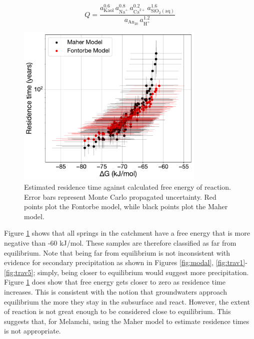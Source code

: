 \begin{equation}
    Q = \frac{a_{\mathrm{Kaol}}^{0.6}\,a_{\mathrm{Na}^{+}}^{0.8}\,a_{\mathrm{Ca}^{2+}}^{0.2}\,a_{\mathrm{SiO_{2}(aq)}}^{1.6}}
           {a_{\mathrm{An_{20}}}\,a_{\mathrm{H}^{+}}^{1.2}}
\end{equation}


\begin{figure}[H]
    \centering
    \includegraphics[width=0.8\textwidth]{DGMF.pdf}
    \caption{Estimated residence time against calculated free energy of reaction. Error bars represent Monte Carlo propagated uncertainty. Red points plot the Fontorbe model, while black points plot the Maher model.}
    \label{fig:deltag}
\end{figure}

\FloatBarrier

Figure \ref{fig:deltag} shows that all springs in the catchment have a free energy that is more negative than -60 kJ/mol. These samples are therefore classified as far from equilibrium. Note that being far from equilibrium is not inconsistent with evidence for secondary precipitation as shown in Figures \ref{fig:modal}, \ref{fig:trav1}-\ref{fig:trav5}; simply, being closer to equilibrium would suggest more precipitation. Figure \ref{fig:deltag} does show that free energy gets closer to zero as residence time increases. This is consistent with the notion that groundwaters approach equilibrium the more they stay in the subsurface and react. However, the extent of reaction is not great enough to be considered close to equilibrium. This suggests that, for Melamchi, using the Maher model to estimate residence times is not appropriate.


